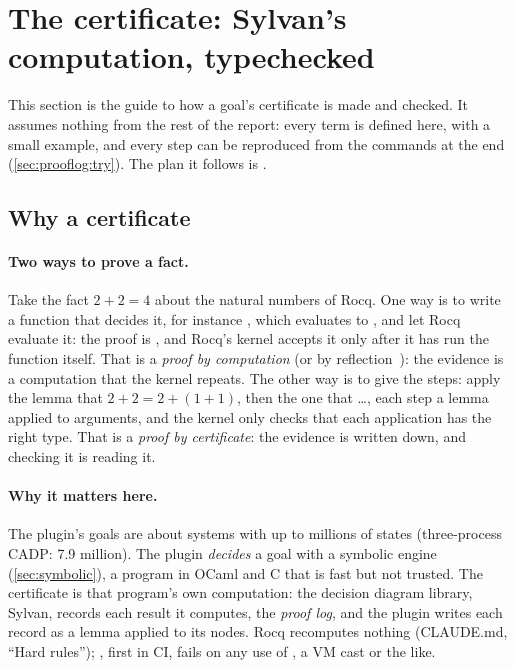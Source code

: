 \section{The certificate: Sylvan's computation, typechecked}\label{sec:prooflog}

This section is the guide to how a goal's certificate is made and
checked. It assumes nothing from the rest of the report: every term is
defined here, with a small example, and every step can be reproduced from
the commands at the end (\cref{sec:prooflog:try}). The plan it follows is
.

\subsection{Why a certificate}\label{sec:prooflog:why}

\paragraph{Two ways to prove a fact.} Take the fact $2 + 2 = 4$ about the
natural numbers of Rocq. One way is to write a function that decides it,
for instance , which evaluates to , and
let Rocq evaluate it: the proof is , and Rocq's kernel accepts
it only after it has run the function itself. That is a \emph{proof by
computation} (or by reflection~\cite{boutin97}): the evidence is a
computation that the kernel repeats. The other way is to give the steps:
apply the lemma that $2 + 2 = 2 + (1 + 1)$, then the one that \dots, each
step a lemma applied to arguments, and the kernel only checks that each
application has the right type. That is a \emph{proof by certificate}: the
evidence is written down, and checking it is reading it.

\paragraph{Why it matters here.} The plugin's goals are about systems with
up to millions of states (three-process CADP: 7.9 million). The plugin
\emph{decides} a goal with a symbolic engine (\cref{sec:symbolic}), a
program in OCaml and C that is fast but not trusted. The certificate is
that program's own computation: the decision diagram library, Sylvan,
records each result it computes, the \emph{proof log}, and the plugin
writes each record as a lemma applied to its nodes. Rocq recomputes
nothing (CLAUDE.md, ``Hard rules''); ,
first in CI, fails on any use of , a VM cast or the like.

